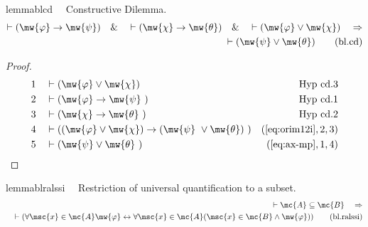 \begin{restatable}{lemma}{blcd}~~ Constructive Dilemma.
\begin{align}
\vdash ( \mw{\varphi} \rightarrow \mw{\psi} )\quad\&\quad \vdash ( \mw{\chi}
    \rightarrow \mw{\theta} )\quad\&\quad \vdash ( \mw{\varphi} \vee \mw{\chi}
    )\quad\Rightarrow \notag \\ 
	\quad \vdash ( \mw{\psi} \vee \mw{\theta}
    )\label{eq:bl.cd}\tag{bl.cd}
\end{align}
\end{restatable}

\begin{proof}
\begin{align}
  1 &&  & \vdash ( \mw{\varphi} \vee \mw{\chi} )&\text{Hyp~cd.3}\notag%
  \\ 2 &&  & \vdash ( \mw{\varphi} \rightarrow \mw{\psi}
     ~)&\text{Hyp~cd.1}\notag%
  \\ 3 &&  & \vdash ( \mw{\chi} \rightarrow \mw{\theta}
     ~)&\text{Hyp~cd.2}\notag%
  \\ 4 &&  & \vdash ( ( \mw{\varphi} \vee \mw{\chi} ) \rightarrow ( \mw{\psi}
     ~\vee \mw{\theta} )
     ~)&(\mbox{\ref{eq:orim12i}},2,3)\notag
  \\ 5 &&  & \vdash ( \mw{\psi} \vee \mw{\theta}
     ~)&(\mbox{\ref{eq:ax-mp}},1,4)\notag
\end{align}
\end{proof}

\begin{restatable}{lemma}{blralssi}~~ Restriction of universal quantification
to a subset.
\begin{align}
\vdash \mc{A} \subseteq \mc{B}\quad\Rightarrow \notag \\ 
	\quad \vdash ( \forall \msc{x}
    \in \mc{A} \mw{\varphi} \leftrightarrow \forall \msc{x} \in \mc{A} (
    \msc{x} \in \mc{B} \wedge \mw{\varphi} )
    )\label{eq:bl.ralssi}\tag{bl.ralssi}
\end{align}
\end{restatable}

